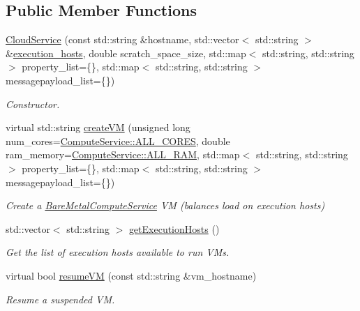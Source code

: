 \subsection*{Public Member Functions}
\begin{DoxyCompactItemize}
\item 
\hyperlink{classwrench_1_1_cloud_service_a9f7f2d8bbbcaf2cd1c2cc881d11afec3}{Cloud\+Service} (const std\+::string \&hostname, std\+::vector$<$ std\+::string $>$ \&\hyperlink{classwrench_1_1_cloud_service_a8225cae457e491f3f3aad32653910ea0}{execution\+\_\+hosts}, double scratch\+\_\+space\+\_\+size, std\+::map$<$ std\+::string, std\+::string $>$ property\+\_\+list=\{\}, std\+::map$<$ std\+::string, std\+::string $>$ messagepayload\+\_\+list=\{\})
\begin{DoxyCompactList}\small\item\em Constructor. \end{DoxyCompactList}\item 
virtual std\+::string \hyperlink{classwrench_1_1_cloud_service_a6e614c2edbe303de83a47c024e84e250}{create\+VM} (unsigned long num\+\_\+cores=\hyperlink{classwrench_1_1_compute_service_a1160f521623440ad4e0e0823e08a7d22}{Compute\+Service\+::\+A\+L\+L\+\_\+\+C\+O\+R\+ES}, double ram\+\_\+memory=\hyperlink{classwrench_1_1_compute_service_abc4fe0bad59f544b4b34d0e7d4012d44}{Compute\+Service\+::\+A\+L\+L\+\_\+\+R\+AM}, std\+::map$<$ std\+::string, std\+::string $>$ property\+\_\+list=\{\}, std\+::map$<$ std\+::string, std\+::string $>$ messagepayload\+\_\+list=\{\})
\begin{DoxyCompactList}\small\item\em Create a \hyperlink{classwrench_1_1_bare_metal_compute_service}{Bare\+Metal\+Compute\+Service} VM (balances load on execution hosts) \end{DoxyCompactList}\item 
std\+::vector$<$ std\+::string $>$ \hyperlink{classwrench_1_1_cloud_service_a6a902accf0e349e2f907f9903243d6c4}{get\+Execution\+Hosts} ()
\begin{DoxyCompactList}\small\item\em Get the list of execution hosts available to run V\+Ms. \end{DoxyCompactList}\item 
virtual bool \hyperlink{classwrench_1_1_cloud_service_a7f6214c3b2b017d00812bf0a425202fc}{resume\+VM} (const std\+::string \&vm\+\_\+hostname)
\begin{DoxyCompactList}\small\item\em Resume a suspended VM. \end{DoxyCompactList}\item 

\end{DoxyCompactItemize}
